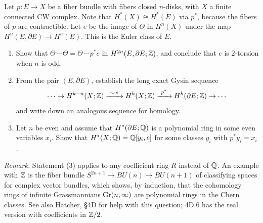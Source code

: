 \documentclass[12pt]{article}  %
\begin{document}
\begin{problem}
Let $p:E\to X$ be a fiber bundle with fibers closed $n$-disks, with $X$ a finite connected CW complex.  Note that $H^{*}(X)\cong H^{*}(E)$ via $p^{*}$, because the fibers of $p$ are contractible.
Let $e$ be the image of $\Theta$ in $H^n(X)$ under the map $H^n(E,\partial E)\to H^n(E)$. This is the Euler class of $E$.
\begin{enumerate}
\item Show that $\Theta\smile\Theta=\Theta\smile p^{*}e$ in $H^{2n}(E,\partial E;\mathbb{Z})$, and conclude that $e$ is $2$-torsion when $n$ is odd.
\item From the pair $(E,\partial E)$, establish the long exact Gysin sequence
\[
\cdots \to H^{k-n}(X;\Z)\xrightarrow{\ \smile e\ } H^k(X;\Z)\xrightarrow{\ p^{*}\ } H^k(\partial E;\Z)\to \cdots
\]
and write down an analogous sequence for homology.
\item Let $n$ be even and assume that $H^{*}(\partial E;\mathbb{Q})$ is a polynomial ring in some even variables $x_i$.
Show that $H^{*}(X;\mathbb{Q})=\mathbb{Q}[y_i,e]$ for some classes $y_i$ with $p^{*}y_i=x_i$.
\end{enumerate}

\noindent\textit{Remark.} Statement (3) applies to any coefficient ring $R$ instead of $\mathbb{Q}$.
An example with $\mathbb{Z}$ is the fiber bundle $S^{2n+1}\to BU(n)\to BU(n+1)$ of classifying spaces for complex vector bundles,
which shows, by induction, that the cohomology rings of infinite Grassmannians $\operatorname{Gr}(n,\infty)$ are polynomial rings in the Chern classes.
See also Hatcher, \S4D for help with this question; 4D.6 has the real version with coefficients in $\mathbb{Z}/2$.
\end{problem}
\end{document}
